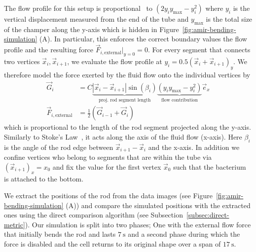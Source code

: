 The flow profile for this setup is proportional~\cite{Wolschin2021} to
$(2y_iy_\text{max}-y_i^2)$
where $y_i$ is the vertical displacement measured from the end of the tube and $y_\text{max}$
is the total size of the champer along the y-axis which is hidden in
Figure~\ref{fig:amir-bending-simulation} (A).
In particular, this enforces the correct boundary values the flow profile and the
resulting force
$\vec{F}_{i,\text{external}}|_{y=0}=0$.
For every segment that connects two vertices $\vec{x}_i,\vec{x}_{i+1}$, we evaluate
the flow profile
at $y_i=0.5(\vec{x}_i+\vec{x}_{i+1})_y$.
We therefore model the force exerted by the fluid flow onto the individual vertices by
\begin{align}
    \vec{G}_i &= C
    \underbrace{|\vec{x}_i - \vec{x}_{i+1}|\sin(\beta_i)}_\text{proj. rod segment length}
    \underbrace{(y_iy_\text{max} - y_i^2)}_\text{flow contribution}\vec{e}_x\\
    \vec{F}_{i,\text{external}} &= \frac{1}{2}(\vec{G}_{i-1}+\vec{G}_i)
\end{align}
which is proportional to the length of the rod segment projected along the y-axis.
Similarly to Stoke's Law~\cite{Stokes1856}, it acts along the axis of the fluid flow (x-axis).
Here $\beta_i$ is the angle of the rod edge between $\vec{x}_{i+1}-\vec{x}_i$ and the x-axis.
In addition we confine vertices who belong to segments that are within the tube
via $(\vec{x}_{i+1})_x=x_0$ and fix the value for the first vertex
$\vec{x}_0$ such that the bacterium is attached to the bottom.

We extract the positions of the rod from the data images (see
Figure~\ref{fig:amir-bending-simulation} (A)) and compare the simulated positions
with the extracted
ones using the direct comparison algorithm (see Subsection~\ref{subsec:direct-metric}).
Our simulation is split into two phases; One with the external flow force that
initially bends the
rod and lasts $\SI{7}{\second}$ and a second phase during which the force is disabled
and the cell
returns to its original shape over a span of $\SI{17}{\second}$.

